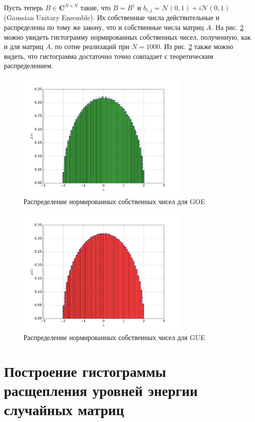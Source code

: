 \documentclass[a4paper]{article}
\begin{document}
Пусть теперь \(B\in \mathbf{C}^{N\times N}\) такие, что \(B=B^\dag\) и
\(b_{i,j} = \mathcal{N}(0,1) + i\mathcal{N}(0,1)\) (Gaussian Unitary Ensemble).
Их собственные числа действительные и распределены по тому же закону, что и собственные числа матриц \(A\).
На рис. \ref{fig:gue_eig} можно увидеть гистограмму нормированных собственных чисел,
полученную, как и для матриц \(A\), по сотне реализаций при \(N=1000\). Из рис.
\ref{fig:gue_eig} также можно видеть, что гистограмма достаточно точно совпадает с
теоретическим распределением.
\begin{figure}[H]
	\center
	\includegraphics[width=0.75\textwidth]{../pictures/lab4_goe_eig_hist.pdf}
	\caption{Распределение нормированных собственных чисел для GOE}
	\label{fig:goe_eig}
\end{figure}
\begin{figure}[H]
	\center
	\includegraphics[width=0.75\textwidth]{../pictures/lab4_gue_eig_hist.pdf}
	\caption{Распределение нормированных собственных чисел для GUE}
	\label{fig:gue_eig}
\end{figure}

\section{Построение гистограммы расщепления уровней энергии случайных матриц}
\end{document}

